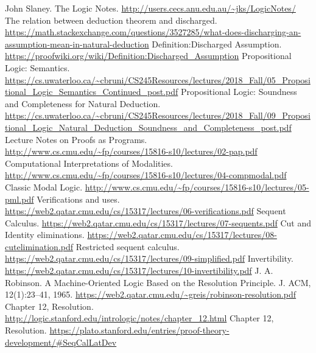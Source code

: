 \documentclass{article}
\theoremstyle{plain}
\theoremstyle{nonumberplain}
\begin{document}
\newpage
\begin{thebibliography}{00}
 John Slaney. The Logic Notes. \newline\url{http://users.cecs.anu.edu.au/~jks/LogicNotes/}
 The relation between deduction theorem and discharged. \newline\url{https://math.stackexchange.com/questions/3527285/what-does-discharging-an-assumption-mean-in-natural-deduction}
 Definition:Discharged Assumption. \newline\url{https://proofwiki.org/wiki/Definition:Discharged_Assumption}
 Propositional Logic: Semantics. \newline\url{https://cs.uwaterloo.ca/~cbruni/CS245Resources/lectures/2018_Fall/05_Propositional_Logic_Semantics_Continued_post.pdf}
 Propositional Logic: Soundness and
Completeness for Natural Deduction. 
\newline\url{https://cs.uwaterloo.ca/~cbruni/CS245Resources/lectures/2018_Fall/09_Propositional_Logic_Natural_Deduction_Soundness_and_Completeness_post.pdf}
 Lecture Notes on Proofs as Programs. \newline\url{http://www.cs.cmu.edu/~fp/courses/15816-s10/lectures/02-pap.pdf}
 Computational Interpretations of Modalities.
\newline\url{http://www.cs.cmu.edu/~fp/courses/15816-s10/lectures/04-compmodal.pdf}
 Classic Modal Logic.
\newline\url{http://www.cs.cmu.edu/~fp/courses/15816-s10/lectures/05-pml.pdf}
 Verifications and uses.
\newline\url{https://web2.qatar.cmu.edu/cs/15317/lectures/06-verifications.pdf}
 Sequent Calculus.
\newline\url{https://web2.qatar.cmu.edu/cs/15317/lectures/07-sequents.pdf}
 Cut and Identity eliminations.
\newline\url{https://web2.qatar.cmu.edu/cs/15317/lectures/08-cutelimination.pdf}
 Restricted sequent calculus.
\newline\url{https://web2.qatar.cmu.edu/cs/15317/lectures/09-simplified.pdf}
 Invertibility.
\newline\url{https://web2.qatar.cmu.edu/cs/15317/lectures/10-invertibility.pdf}
 J. A. Robinson. A Machine-Oriented Logic Based on the Resolution Principle. J. ACM, 12(1):23–41, 1965.
\newline\url{https://web2.qatar.cmu.edu/~greis/robinson-resolution.pdf}
 Chapter 12, Resolution.
\newline\url{http://logic.stanford.edu/intrologic/notes/chapter_12.html}
 Chapter 12, Resolution.
\newline\url{https://plato.stanford.edu/entries/proof-theory-development/#SeqCalLatDev}
\end{thebibliography}
\end{document}
